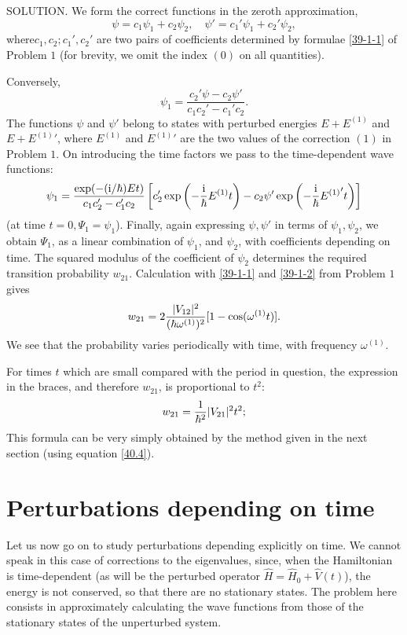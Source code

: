{SOLUTION. We form the correct functions in the zeroth approximation,
\[ \psi=c_1\psi_1+c_2\psi_2,\quad\psi'=c_1'\psi_1+c_2'\psi_2, \]
where$  c_1, c_2; c_1', c_2' $ are two pairs of coefficients determined by formulae \eqref{39-1-1} of Problem $ 1 $ (for brevity, we omit the index $ (0) $ on all quantities).

Conversely,
\[ \psi_1=\frac{c_2'\psi-c_2\psi'}{c_1c_2'-c_1'c_2}. \]
The functions $\psi$ and $\psi'$ belong to states with perturbed energies $ E + E^{(1)} $ and $ E + {E^{(1)}}' $, where $ E^{(1)} $ and $ {E^{(1)}}' $ are the two values of the correction $ (1) $ in Problem $ 1 $. On introducing the time factors we pass to the time-dependent wave functions:
\[ \psi_1=\frac{\exp(-(\mathrm{i}/\hbar)Et)}{c_1c_2'-c_1'c_2}\left[ c_2'\exp\left(-\frac{\mathrm{i}}{\hbar}E^{(1)}t \right)-c_2\psi'\exp\left(-\frac{\mathrm{i}}{\hbar}{E^{(1)}}'t \right) \right] \]
(at time $ t = 0, \Psi_1 = \psi_1 $). Finally, again expressing $ \psi, \psi' $ in terms of $ \psi_1, \psi_2 $, we obtain $ \Psi_1 $, as a linear combination of $ \psi_1 $, and $ \psi_2 $, with coefficients depending on time. The squared modulus of the coefficient of $ \psi_2 $ determines the required transition probability $ w_{21} $. Calculation with \eqref{39-1-1} and \eqref{39-1-2} from Problem $ 1 $ gives
\[ w_{21}=2\frac{|V_{12}|^2}{(\hbar\omega^{(1)})^2}[1-\cos(\omega^{(1)}t)]. \]
We see that the probability varies periodically with time, with frequency $ \omega^{(1)} $.

For times $ t $ which are small compared with the period in question, the expression in the braces, and therefore $ w_{21} $, is proportional to $ t^2 $: 
\[ w_{21}=\frac{1}{\hbar^2}|V_{21}|^2t^2; \]
This formula can be very simply obtained by the method given in the next section (using equation \eqref{40.4}).}






\section{Perturbations depending on time}\label{Perturbations depending on time}
Let us now go on to study perturbations depending explicitly on time. We cannot speak in this case of corrections to the eigenvalues, since, when the Hamiltonian is time-dependent (as will be the perturbed operator $ \hat{H}=\hat{H}_0+\hat{V}(t) $), the energy is not conserved, so that there are no stationary states. The problem here consists in approximately calculating the wave functions from those of the stationary states of the unperturbed system.

